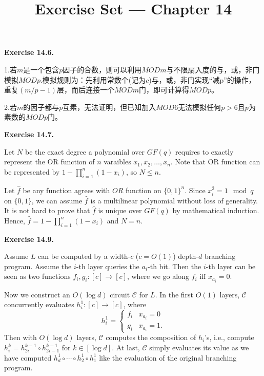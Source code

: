 \documentclass[a4paper]{article}
\title{Exercise Set --- Chapter 14}
\date{}
\newenvironment{exercise}[1]{
	\par
	\noindent\textbf{Exercise #1.}\quad
}{
	\par
	\bigskip
}
\begin{document}
    \maketitle
    \begin{exercise}{14.6}
        1.若$m$是一个包含$p$因子的合数，则可以利用$MOD m$与不限扇入度的与，或，非门模拟$MOD p$.模拟规则为：先利用常数个(记为$c$)与，或，非门实现“减p”的操作，重复$(m/p-1)$层，而后连接一个$MOD m$门，即可计算得$MOD p$。
        
        2.若$m$的因子都与$p$互素，无法证明，但已知加入$MOD 6$无法模拟任何$p>6$且$p$为素数的$MOD p$门。
    \end{exercise}

    \begin{exercise}{14.7}
        Let $N$ be the exact degree a polynomial over $GF(q)$ requires to exactly represent the OR function of $n$ varaibles $x_1,x_2,\dots,x_n $. Note that OR function can be represented by $1-\prod _{i=1}^n (1-x_i)$, so $N \leq n$. 
      
        Let $\hat{f}$ be any function agrees with $OR$ function on $\{0,1\}^n$. Since $x_i^2 =1 \mod q$ on $\{0,1\}$, we can assume $\hat{f}$ is a multilinear polynomial without loss of generality. It is not hard to prove that $\hat{f}$ is unique over $GF(q)$ by mathematical induction. Hence, $\hat{f}=1-\prod _{i=1}^n (1-x_i)$ and $N=n$.
    \end{exercise}

    \begin{exercise}{14.9}
        Assume $L$ can be computed by a width-$c$ ($c=O(1)$) depth-$d$ branching program. 
        Assume the $i$-th layer queries the $a_i$-th bit. Then the $i$-th layer can be seen as two functions 
        $f_i,g_i:[c]\to[c]$, where we go along $f_i$ iff $x_{a_i}=0$.

        Now we construct an $O(\log d)$ circuit $\mathcal C$ for $L$. In the first $O(1)$ layers, $\mathcal C$ concurrently evaluates
        $h_i^1:[c]\to[c]$, where 
        $$
        h_i^1=\begin{cases}
            f_i&x_{a_i}=0\\
            g_i&x_{a_i}=1.
        \end{cases}
        $$
        Then with $O(\log d)$ layers, $\mathcal C$ computes the composition of $h_i$'s, i.e., compute
        $h_i^k=h_{2i}^{k-1}\circ h_{2i-1}^{k-1}$ for $k\in[\log d]$.
        At last, $\mathcal C$ simply evaluates its value as we have computed $h_d^1\circ\cdots\circ h_2^1\circ h_1^1$ like the evaluation of the original branching program.
    \end{exercise}
\end{document}
